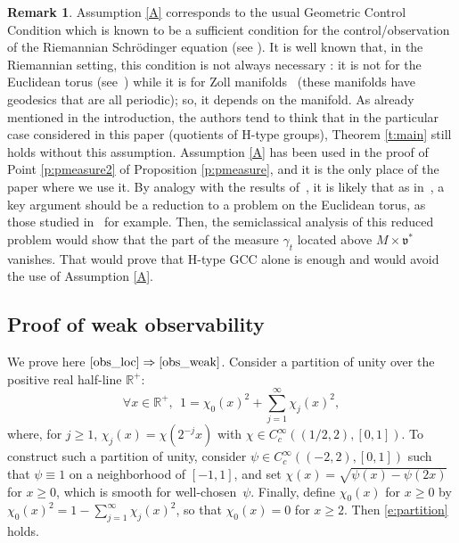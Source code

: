 \documentclass[JEP,XML,SOM,Unicode,published]{cedram}
\theoremstyle{plain}
\theoremstyle{definition}
\newtheorem{remark}[theorem]{Remark}
\def\R{{\mathbb R}}
\begin{document}
\begin{remark} \label{r:assumpA}
Assumption \eqref{A} corresponds to the usual Geometric Control Condition which is known to be a sufficient condition for the control/observation of the Riemannian Schrödinger equation (see \cite{Leb}). It is well known that, in the Riemannian setting, this condition is not always necessary : it is not for the Euclidean torus (see~\cite{J,AM14,BZ}) while it is for Zoll manifolds~\cite{Mac11} (these manifolds have geodesics that are all periodic); so, it depends on the manifold. As already mentioned in the introduction, the authors tend to think that in the particular case considered in this paper (quotients of H-type groups), Theorem \ref{t:main} still holds without this assumption. Assumption \eqref{A} has been used in the proof of Point \eqref{p:pmeasure2} of Proposition \ref{p:pmeasure}, and it is the only place of the paper where we use it. By analogy with the results of~\cite{AM14,AFM15,BS}, it is likely that as in~\cite[\S 7]{BS}, a key argument should be a reduction to a problem on the Euclidean torus, as those studied in~\cite{AFM15} for example. Then, the semiclassical analysis of this reduced problem would show that the part of the measure $\gamma_t$ located above $M\times {\mathfrak v}^*$ vanishes. That would prove that H-type GCC alone is enough and would avoid the use of Assumption \eqref{A}.
\end{remark}

\subsection{Proof of weak observability}\label{s:weakobs}

We prove here  $\eqref{obs_loc} \Rightarrow\eqref{obs_weak}$.
Consider a partition of unity over the positive real half-line $\R^+$:
\begin{equation} \label{e:partition}
\forall x\in\R^+, \ \ 1=\chi_0(x)^2+\sum_{j=1}^\infty \chi_j(x)^2,
\end{equation}
where, for $j\geq1$, $\chi_j(x)=\chi(2^{-j}x)$ with $\chi\in C_c^\infty((1/2,2),[0,1])$. To construct such a partition of unity, consider $\psi\in C_c^\infty((-2,2),[0,1])$ such that $\psi\equiv 1$ on a neighborhood of $[-1,1]$, and set $\chi(x)=\sqrt{\psi(x)-\psi(2x)}$ for $x\geq 0$, which is smooth for well-chosen~$\psi$. Finally, define $\chi_0(x)$ for $x\geq 0$ by $\chi_0(x)^2=1-\sum_{j=1}^\infty \chi_j(x)^2$, so that $\chi_0(x)=0$ for $x\geq 2$. Then \eqref{e:partition} holds.
\end{document}
